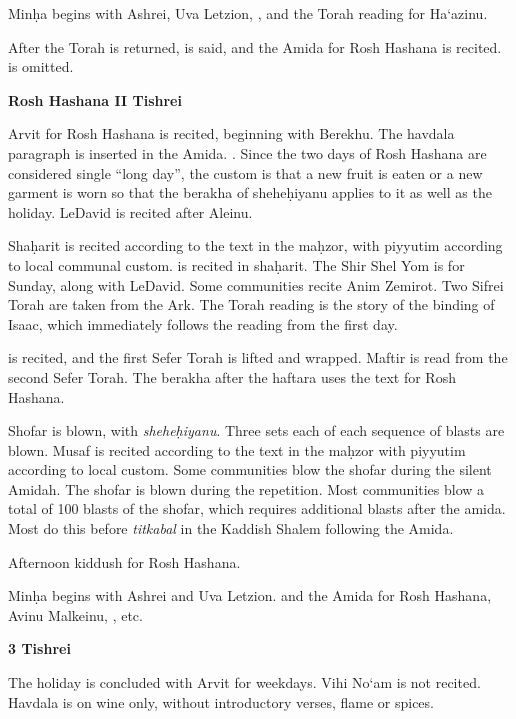 {	Min\d{h}a begins with Ashrei, Uva Letzion, \halfkad , and the Torah reading for Ha`azinu. 
	
	\leinHaazinuweekday
	
	After the Torah is returned, \halfkad\space is said, and the Amida for Rosh Hashana is recited. \space is omitted.
	
	\textbf{Rosh Hashana II \textendash{} Tishrei}
	
	Arvit for Rosh Hashana is recited, beginning with Berekhu.  The havdala paragraph is inserted in the Amida.  \yakenhaz . Since the two days of Rosh Hashana are considered single ``long day'', the custom is that a new fruit is eaten or a new garment is worn so that the berakha of shehe\d{h}iyanu applies to it as well as the holiday. LeDavid is recited after Aleinu.
	
	Sha\d{h}arit is recited according to the text in the ma\d{h}zor, with piyyutim according to local communal custom.  is recited in sha\d{h}arit. The Shir Shel Yom is for Sunday, along with LeDavid.  Some communities recite Anim Zemirot.  Two Sifrei Torah are taken from the Ark.  The Torah reading is the story of the binding of Isaac, which immediately follows the reading from the first day.
	
	\leinRoshHashanaII
	
	\halfkad\space is recited, and the first Sefer Torah is lifted and wrapped. Maftir is read from the second Sefer Torah. \haftRoshHashanaII The berakha after the haftara uses the text for Rosh Hashana.
	
	Shofar is blown, with \textit{shehe\d{h}iyanu}. Three sets each of each sequence of blasts are blown.  Musaf is recited according to the text in the ma\d{h}zor with piyyutim according to local custom. Some communities blow the shofar during the silent Amidah.  The shofar is blown during the repetition.  Most communities blow a total of 100 blasts of the shofar, which requires additional blasts after the amida.  Most do this before \textit{titkabal} in the Kaddish Shalem following the Amida.
	
	Afternoon kiddush for Rosh Hashana.
	
	Min\d{h}a begins with Ashrei and Uva Letzion. \halfkad\space and the Amida for Rosh Hashana, Avinu Malkeinu, \fullkad , etc.
	
	\textbf{3 Tishrei}
	
	The holiday is concluded with Arvit for weekdays. Vihi No`am is not recited. Havdala is on wine only, without introductory verses, flame or spices.
}


